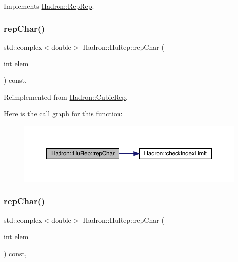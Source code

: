 Implements \mbox{\hyperlink{structHadron_1_1RepRep_ab3213025f6de249f7095892109575fde}{Hadron\+::\+Rep\+Rep}}.

\mbox{\label{structHadron_1_1HuRep_a764617bf3dabef7cd69ffa034e550fff}} 
\subsubsection{\texorpdfstring{repChar()}{repChar()}\hspace{0.1cm}{\footnotesize\ttfamily [1/3]}}
{\footnotesize\ttfamily std\+::complex$<$double$>$ Hadron\+::\+Hu\+Rep\+::rep\+Char (\begin{DoxyParamCaption}\item[{int}]{elem }\end{DoxyParamCaption}) const\hspace{0.3cm}{\ttfamily [inline]}, {\ttfamily [virtual]}}



Reimplemented from \mbox{\hyperlink{structHadron_1_1CubicRep_af45227106e8e715e84b0af69cd3b36f8}{Hadron\+::\+Cubic\+Rep}}.

Here is the call graph for this function\+:
\nopagebreak
\begin{figure}[H]
\begin{center}
\leavevmode
\includegraphics[width=350pt]{d9/dd4/structHadron_1_1HuRep_a764617bf3dabef7cd69ffa034e550fff_cgraph}
\end{center}
\end{figure}
\mbox{\label{structHadron_1_1HuRep_a764617bf3dabef7cd69ffa034e550fff}} 
\subsubsection{\texorpdfstring{repChar()}{repChar()}\hspace{0.1cm}{\footnotesize\ttfamily [2/3]}}
{\footnotesize\ttfamily std\+::complex$<$double$>$ Hadron\+::\+Hu\+Rep\+::rep\+Char (\begin{DoxyParamCaption}\item[{int}]{elem }\end{DoxyParamCaption}) const\hspace{0.3cm}{\ttfamily [inline]}, {\ttfamily [virtual]}}




